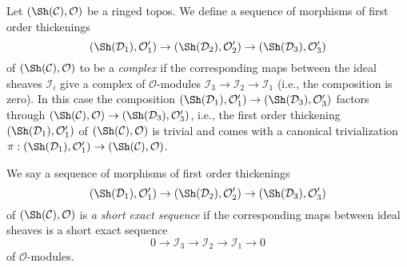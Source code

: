 \begin{remark}
\label{remark-short-exact-sequence-thickenings-ringed-topoi}
Let $(\Sh(\mathcal{C}), \mathcal{O})$ be a ringed topos.
We define a sequence of morphisms of first order thickenings
$$
(\Sh(\mathcal{D}_1), \mathcal{O}'_1) \to
(\Sh(\mathcal{D}_2), \mathcal{O}'_2) \to
(\Sh(\mathcal{D}_3), \mathcal{O}'_3)
$$
of $(\Sh(\mathcal{C}), \mathcal{O})$ to be a {\it complex}
if the corresponding maps between
the ideal sheaves $\mathcal{I}_i$
give a complex of $\mathcal{O}$-modules
$\mathcal{I}_3 \to \mathcal{I}_2 \to \mathcal{I}_1$
(i.e., the composition is zero). In this case the composition
$(\Sh(\mathcal{D}_1), \mathcal{O}'_1) \to
(\Sh(\mathcal{D}_3), \mathcal{O}'_3)$ factors through
$(\Sh(\mathcal{C}), \mathcal{O}) \to
(\Sh(\mathcal{D}_3), \mathcal{O}'_3)$, i.e.,
the first order thickening
$(\Sh(\mathcal{D}_1), \mathcal{O}'_1)$ of
$(\Sh(\mathcal{C}), \mathcal{O})$ is trivial and comes with
a canonical trivialization
$\pi : (\Sh(\mathcal{D}_1), \mathcal{O}'_1) \to
(\Sh(\mathcal{C}), \mathcal{O})$.

\medskip\noindent
We say a sequence of morphisms of first order thickenings
$$
(\Sh(\mathcal{D}_1), \mathcal{O}'_1) \to
(\Sh(\mathcal{D}_2), \mathcal{O}'_2) \to
(\Sh(\mathcal{D}_3), \mathcal{O}'_3)
$$
of $(\Sh(\mathcal{C}), \mathcal{O})$ is {\it a short exact sequence} if the
corresponding maps between ideal sheaves is a short exact sequence
$$
0 \to \mathcal{I}_3 \to \mathcal{I}_2 \to \mathcal{I}_1 \to 0
$$
of $\mathcal{O}$-modules.
\end{remark}


